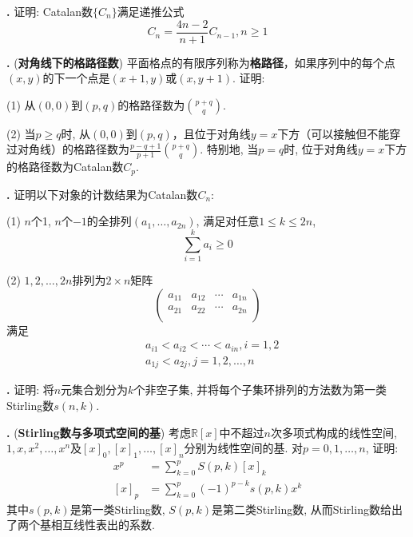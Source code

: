 \par \textbf{\theprobenum .} \cite{IC} 证明: Catalan数$\{C_n\}$满足递推公式
\begin{equation}
    C_n = \frac{4n-2}{n+1}C_{n-1}, n\ge 1
\end{equation}

\par \textbf{\theprobenum .} (\textbf{对角线下的格路径数}) 平面格点的有限序列称为\textbf{格路径}，如果序列中的每个点$(x,y)$的下一个点是$(x+1,y)$或$(x,y+1)$. 证明:
\par (1) 从$(0,0)$到$(p,q)$的格路径数为$\binom{p+q}{q}$. 
\par (2) 当$p\ge q$时, 从$(0,0)$到$(p,q)$，且位于对角线$y=x$下方（可以接触但不能穿过对角线）的格路径数为$\frac{p-q+1}{p+1}\binom{p+q}{q}$. 特别地, 当$p=q$时, 位于对角线$y=x$下方的格路径数为Catalan数$C_p$. 

\par \textbf{\theprobenum .} \cite{IC} 证明以下对象的计数结果为Catalan数$C_n$: 
\par (1) $n$个1, $n$个$-1$的全排列$(a_1,\dots,a_{2n})$, 满足对任意$1\le k\le 2n$, 
\begin{equation*}
    \sum_{i=1}^{k} a_i \ge 0
\end{equation*}
\par (2) $1,2,\dots,2n$排列为$2\times n$矩阵
\begin{equation*}
    \left(\begin{matrix}
        a_{11} & a_{12} & \cdots & a_{1n}\\
        a_{21} & a_{22} & \cdots & a_{2n}\\
    \end{matrix}\right)
\end{equation*}
满足
\begin{align*}
    &a_{i1} < a_{i2} < \cdots < a_{in}, i=1,2\\
    &a_{1j} < a_{2j}, j=1,2,\dots,n
\end{align*}

\par \textbf{\theprobenum .} \cite{IC} 证明: 将$n$元集合划分为$k$个非空子集, 并将每个子集环排列的方法数为第一类Stirling数$s(n,k)$. 

\par \textbf{\theprobenum .} (\textbf{Stirling数与多项式空间的基}) 考虑$\mathbb{R}[x]$中不超过$n$次多项式构成的线性空间, $1,x,x^2,\dots,x^n$及$[x]_0, [x]_1,\dots, [x]_n$分别为线性空间的基. 对$p=0,1,\dots,n$, 证明:
\begin{align}
    x^p &= \sum_{k=0}^p S(p,k) [x]_k\\
    [x]_p &= \sum_{k=0}^p (-1)^{p-k} s(p,k) x^k
\end{align}
其中$s(p,k)$是第一类Stirling数, $S(p,k)$是第二类Stirling数, 从而Stirling数给出了两个基相互线性表出的系数. 


